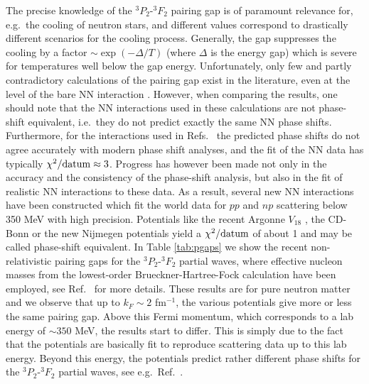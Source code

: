 \documentclass{ws-p9-75x6-50}
\begin{document}
The precise knowledge of the $^3P_2$-$^3F_2$ pairing gap is of 
paramount relevance for, e.g.\  the cooling of neutron stars, 
and different values correspond to drastically
different scenarios for the cooling process.
Generally, the gap suppresses the cooling by a factor
$\sim\exp(-\Delta/T)$ (where $\Delta$ is the energy gap)
which is severe for
temperatures well below the gap energy.
Unfortunately, only few and partly
contradictory calculations of the pairing gap exist in the literature, 
even at the level of the bare NN interaction 
\cite{amu85,bcll92,taka93,elga96,khodel97}. 
However, when comparing the results, one should note that the  
NN interactions used in these calculations are not phase-shift 
equivalent, i.e.\  they do not 
predict exactly the same NN phase shifts.  
Furthermore, for the interactions used in 
Refs.~\cite{amu85,bcll92,taka93,elga96} the predicted 
phase shifts do not agree accurately with modern phase shift 
analyses, and the fit of the NN data has typically 
$\chi^2/{\rm datum}\approx 3$.  
Progress has 
however been made not only in the accuracy and the consistency of the 
phase-shift analysis, but also in the fit of realistic NN interactions 
to these data.  As a result, several new NN interactions have 
been constructed which fit the world data for $pp$ and $np$ scattering 
below 350 MeV with high precision.  Potentials like the recent 
Argonne $V_{18}$ \cite{v18}, the CD-Bonn \cite{cdbonn} 
or the new Nijmegen potentials \cite{nim} yield a 
$\chi^2/{\rm datum}$ of about 1 and may be called phase-shift 
equivalent.  
In Table \ref{tab:pgaps} we show the recent non-relativistic
pairing gaps for the $^3P_2$-$^3F_2$ partial waves, where
effective nucleon masses from the  lowest-order Brueckner-Hartree-Fock
calculation have been 
employed, see Ref.\ \cite{beehs98} for more details.
These results are for pure neutron matter and we observe that
up to $k_F\sim 2$ fm$^{-1}$, the various potentials
give more
or less the same pairing gap. Above this Fermi momentum, which
corresponds to a lab energy of $\sim 350$ MeV, the results start
to differ. This is simply due to the fact that the potentials
are basically fit to reproduce scattering data up to this
lab energy. Beyond this energy, the potentials predict rather
different phase shifts for the 
$^3P_2$-$^3F_2$ partial waves, see e.g.\  Ref.\ \cite{beehs98}.
\end{document}
